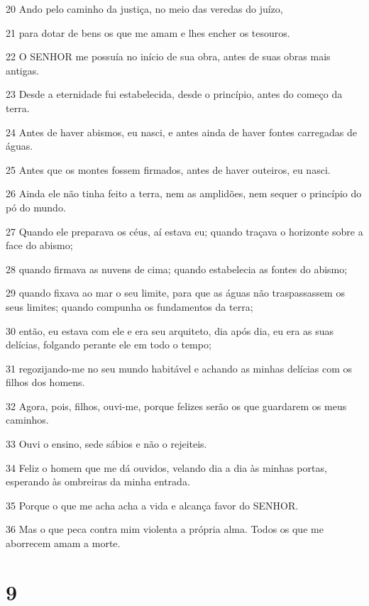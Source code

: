 \par 20 Ando pelo caminho da justiça, no meio das veredas do juízo,
\par 21 para dotar de bens os que me amam e lhes encher os tesouros.
\par 22 O SENHOR me possuía no início de sua obra, antes de suas obras mais antigas.
\par 23 Desde a eternidade fui estabelecida, desde o princípio, antes do começo da terra.
\par 24 Antes de haver abismos, eu nasci, e antes ainda de haver fontes carregadas de águas.
\par 25 Antes que os montes fossem firmados, antes de haver outeiros, eu nasci.
\par 26 Ainda ele não tinha feito a terra, nem as amplidões, nem sequer o princípio do pó do mundo.
\par 27 Quando ele preparava os céus, aí estava eu; quando traçava o horizonte sobre a face do abismo;
\par 28 quando firmava as nuvens de cima; quando estabelecia as fontes do abismo;
\par 29 quando fixava ao mar o seu limite, para que as águas não traspassassem os seus limites; quando compunha os fundamentos da terra;
\par 30 então, eu estava com ele e era seu arquiteto, dia após dia, eu era as suas delícias, folgando perante ele em todo o tempo;
\par 31 regozijando-me no seu mundo habitável e achando as minhas delícias com os filhos dos homens.
\par 32 Agora, pois, filhos, ouvi-me, porque felizes serão os que guardarem os meus caminhos.
\par 33 Ouvi o ensino, sede sábios e não o rejeiteis.
\par 34 Feliz o homem que me dá ouvidos, velando dia a dia às minhas portas, esperando às ombreiras da minha entrada.
\par 35 Porque o que me acha acha a vida e alcança favor do SENHOR.
\par 36 Mas o que peca contra mim violenta a própria alma. Todos os que me aborrecem amam a morte.

\chapter{9}

